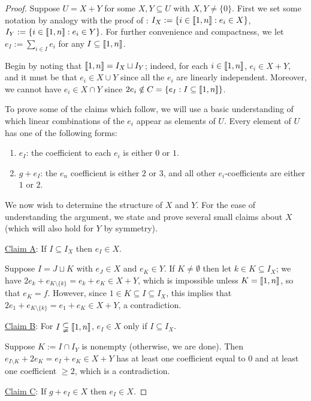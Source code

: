 \begin{proof}
Suppose $U = X + Y$ for some $X,Y\subseteq U$ with $X,Y\neq \{0\}$.
First we set some notation by analogy with the proof of \cite[Theorem 4.10]{fan-tringali18}: $I_X := \{i\in \llbracket 1,n \rrbracket: e_i\in X\}$, $I_Y := \{i\in \llbracket1,n \rrbracket: e_i\in Y \}$.
For further convenience and compactness, we let $e_I := \sum_{i\in I}e_i$ for any $I\subseteq \llbracket 1,n \rrbracket$.

Begin by noting that $\llbracket 1,n \rrbracket = I_X \sqcup I_Y$; indeed, for each $i\in\llbracket 1,n \rrbracket$, $e_i\in X+Y$, and it must be that $e_i\in X\cup Y$ since all the $e_i$ are linearly independent.  
Moreover, we cannot have $e_i\in X\cap Y$ since $2e_i \notin C = \{e_I : I\subseteq \llbracket 1,n \rrbracket \}$.

To prove some of the claims which follow, we will use a basic understanding of which linear combinations of the $e_i$ appear as elements of $U$.
Every element of $U$ has one of the following forms:
\begin{enumerate}[label={\rm (F\arabic{*})}]
\item $e_I$: the coefficient to each $e_i$ is either $0$ or $1$.
\item $g+e_I$: the $e_n$ coefficient is either $2$ or $3$, and all other $e_i$-coefficients are either $1$ or $2$.
\end{enumerate}

We now wish to determine the structure of $X$ and $Y$.
For the ease of understanding the argument, we state and prove several small claims about $X$ (which will also hold for $Y$ by symmetry).

\noindent\underline{Claim A}: If $I\subseteq I_X$ then $e_I\in X$. 

Suppose $I = J\sqcup K$ with $e_J\in X$ and $e_K\in Y$.
If $K\neq \emptyset$ then let $k\in K\subseteq I_X$; we have $2e_k + e_{K\setminus\{k\}} = e_k + e_K\in X+Y$, which is impossible unless $K = \llbracket 1,n\rrbracket$, so that $e_K = f$.
However, since $1\in K\subseteq I\subseteq I_X$, this implies that $2e_1 + e_{K\setminus\{k\}} = e_1 + e_K\in X+Y$, a contradiction.

\noindent\underline{Claim B}: For $I\subsetneqq \llbracket 1,n \rrbracket$, $e_I\in X$ only if $I\subseteq I_X$.

Suppose $K := I \cap I_Y$ is nonempty (otherwise, we are done).
Then $e_{I\setminus K} + 2e_K = e_I + e_K \in X +Y$ has at least one coefficient equal to $0$ and at least one coefficient $\ge 2$, which is a contradiction.

\noindent\underline{Claim C}: If $g + e_I\in X$ then $e_I\in X$. 


\end{proof}
